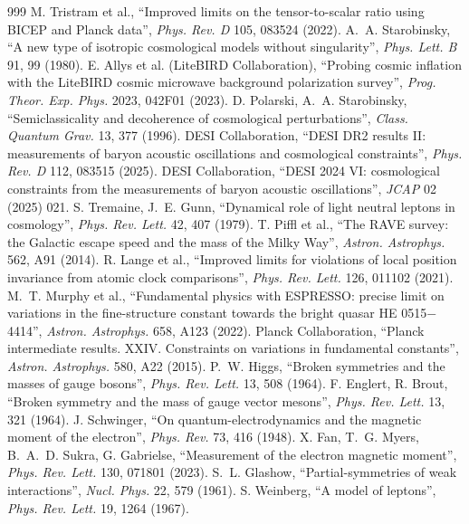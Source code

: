 \documentclass[11pt,a4paper]{article}
\theoremstyle{definition}
\theoremstyle{remark}
\theoremstyle{definition}
\begin{document}
\begin{thebibliography}{999}
 M. Tristram et al., ``Improved limits on the tensor-to-scalar ratio using BICEP and Planck data'', \emph{Phys. Rev. D}
105, 083524 (2022).
 A.~A. Starobinsky, ``A new type of isotropic cosmological models without singularity'', \emph{Phys. Lett. B} 91,
99 (1980).
 E. Allys et al. (LiteBIRD Collaboration), ``Probing cosmic inflation with the LiteBIRD cosmic microwave background
polarization survey'', \emph{Prog. Theor. Exp. Phys.} 2023, 042F01 (2023).
 D. Polarski, A.~A. Starobinsky, ``Semiclassicality and decoherence of cosmological perturbations'', \emph{Class. Quantum
Grav.} 13, 377 (1996).
 DESI Collaboration, ``DESI DR2 results II: measurements of baryon acoustic oscillations and cosmological constraints'',
\emph{Phys. Rev. D} 112, 083515 (2025).
 DESI Collaboration, ``DESI 2024 VI: cosmological constraints from the measurements of baryon acoustic oscillations'',
\emph{JCAP} 02 (2025) 021.
 S. Tremaine, J.~E. Gunn, ``Dynamical role of light neutral leptons in cosmology'', \emph{Phys. Rev. Lett.} 42, 407
(1979).
 T. Piffl et al., ``The RAVE survey: the Galactic escape speed and the mass of the Milky Way'', \emph{Astron. Astrophys.}
562, A91 (2014).
 R. Lange et al., ``Improved limits for violations of local position invariance from atomic clock comparisons'',
\emph{Phys. Rev. Lett.} 126, 011102 (2021).
 M.~T. Murphy et al., ``Fundamental physics with ESPRESSO: precise limit on variations in the fine-structure constant
towards the bright quasar HE 0515$-$4414'', \emph{Astron. Astrophys.} 658, A123 (2022).
 Planck Collaboration, ``Planck intermediate results. XXIV. Constraints on variations in fundamental constants'',
\emph{Astron. Astrophys.} 580, A22 (2015).
 P.~W. Higgs, ``Broken symmetries and the masses of gauge bosons'', \emph{Phys. Rev. Lett.} 13, 508 (1964).
 F. Englert, R. Brout, ``Broken symmetry and the mass of gauge vector mesons'', \emph{Phys. Rev. Lett.} 13, 321 (1964).
 J. Schwinger, ``On quantum-electrodynamics and the magnetic moment of the electron'', \emph{Phys. Rev.} 73, 416
(1948).
 X. Fan, T.~G. Myers, B.~A.~D. Sukra, G. Gabrielse, ``Measurement of the electron magnetic moment'', \emph{Phys. Rev. Lett.}
130, 071801 (2023).
 S.~L. Glashow, ``Partial-symmetries of weak interactions'', \emph{Nucl. Phys.} 22, 579 (1961).
 S. Weinberg, ``A model of leptons'', \emph{Phys. Rev. Lett.} 19, 1264 (1967).

\end{thebibliography}
\end{document}
